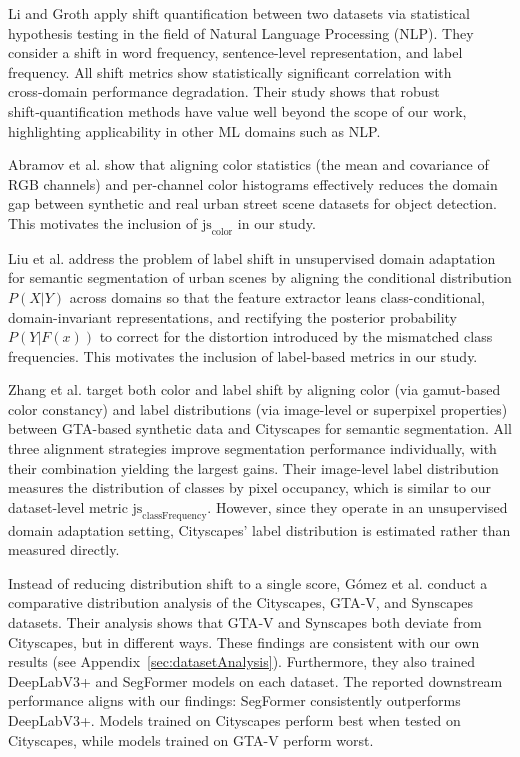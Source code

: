 \documentclass[conference]{IEEEtran}
\begin{document}
Li and Groth \cite{li2025} apply shift quantification between two datasets via statistical hypothesis testing in the field of Natural Language Processing (NLP). They consider a shift in word frequency, sentence-level representation, and label frequency. All shift metrics show statistically significant correlation with cross‑domain performance degradation. Their study shows that robust shift‑quantification methods have value well beyond the scope of our work, highlighting applicability in other ML domains such as NLP.

Abramov et al. \cite{abramov2020} show that aligning color statistics (the mean and covariance of RGB channels) and per-channel color histograms effectively reduces the domain gap between synthetic and real urban street scene datasets for object detection. This motivates the inclusion of $\text{js}_{\text{color}}$ in our study.

Liu et al. \cite{liu2022_labelShift} address the problem of label shift in unsupervised domain adaptation for semantic segmentation of urban scenes by aligning the conditional distribution $P(X|Y)$ across domains so that the feature extractor leans class-conditional, domain-invariant representations, and rectifying the posterior probability $P(Y|F(x))$ to correct for the distortion introduced by the mismatched class frequencies. This motivates the inclusion of label-based metrics in our study.

Zhang et al. \cite{zhang2020} target both color and label shift by aligning color (via gamut-based color constancy) and label distributions (via image-level or superpixel properties) between GTA-based synthetic data and Cityscapes for semantic segmentation. All three alignment strategies improve segmentation performance individually, with their combination yielding the largest gains. Their image-level label distribution measures the distribution of classes by pixel occupancy, which is similar to our dataset-level metric $\text{js}_{\text{classFrequency}}$. However, since they operate in an unsupervised domain adaptation setting, Cityscapes' label distribution is estimated rather than measured directly.

Instead of reducing distribution shift to a single score, G\'omez et al. \cite{urbansyn} conduct a comparative distribution analysis of the Cityscapes, GTA‑V, and Synscapes datasets. Their analysis shows that GTA‑V and Synscapes both deviate from Cityscapes, but in different ways. These findings are consistent with our own results (see Appendix~\ref{sec:datasetAnalysis}). Furthermore, they also trained DeepLabV3+ and SegFormer models on each dataset. The reported downstream performance aligns with our findings: SegFormer consistently outperforms DeepLabV3+. Models trained on Cityscapes perform best when tested on Cityscapes, while models trained on GTA-V perform worst.
\end{document}
